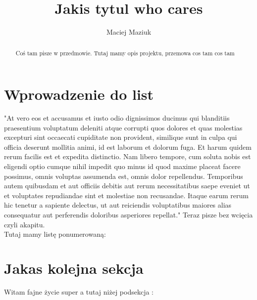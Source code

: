 \documentclass[12pt,a4paper]{article}
\title{Jakis tytul who cares}
\author{Maciej Maziuk}
\begin{document}
\maketitle
\begin{abstract}
    Coś tam pisze w przedmowie. Tutaj mamy opis projektu, przemowa cos tam cos tam
\end{abstract}

\section{Wprowadzenie do list}

"At vero eos et accusamus et iusto odio dignissimos ducimus qui blanditiis praesentium voluptatum deleniti atque corrupti quos dolores et quas molestias excepturi sint occaecati cupiditate non provident, similique sunt in culpa qui officia deserunt mollitia animi, id est laborum et dolorum fuga. Et harum quidem rerum facilis est et expedita distinctio. Nam libero tempore, cum soluta nobis est eligendi optio cumque nihil impedit quo minus id quod maxime placeat facere possimus, omnis voluptas assumenda est, omnis dolor repellendus. Temporibus autem quibusdam et aut officiis debitis aut rerum necessitatibus saepe eveniet ut et voluptates repudiandae sint et molestiae non recusandae. Itaque earum rerum hic tenetur a sapiente delectus, ut aut reiciendis voluptatibus maiores alias consequatur aut perferendis doloribus asperiores repellat."
\noindent Teraz pisze bez wcięcia czyli akapitu. \\
Tutaj mamy listę ponumerowaną: 


\section{Jakas kolejna sekcja}

Witam fajne życie super a tutaj niżej podsekcja : 
\end{document}

